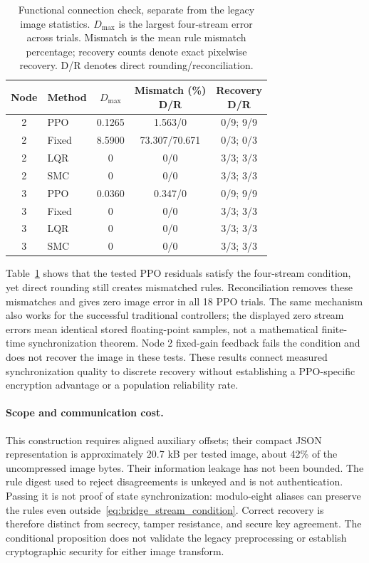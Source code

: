 \begin{table}[pos=htbp,width=\linewidth]
\centering\small
\setlength{\tabcolsep}{3pt}
\caption{Functional connection check, separate from the legacy image statistics. $D_{\max}$ is the largest four-stream error across trials. Mismatch is the mean rule mismatch percentage; recovery counts denote exact pixelwise recovery. D/R denotes direct rounding/reconciliation.}
\label{tab:sync_application_bridge}
\begin{tabular}{@{}clccc@{}}
\toprule
Node & Method & $D_{\max}$ & \makecell{Mismatch (\%)\\D/R} & \makecell{Recovery\\D/R}\\
\midrule
2 & PPO & 0.1265 & 1.563/0 & 0/9; 9/9\\
2 & Fixed & 8.5900 & 73.307/70.671 & 0/3; 0/3\\
2 & LQR & 0 & 0/0 & 3/3; 3/3\\
2 & SMC & 0 & 0/0 & 3/3; 3/3\\
3 & PPO & 0.0360 & 0.347/0 & 0/9; 9/9\\
3 & Fixed & 0 & 0/0 & 3/3; 3/3\\
3 & LQR & 0 & 0/0 & 3/3; 3/3\\
3 & SMC & 0 & 0/0 & 3/3; 3/3\\
\bottomrule
\end{tabular}
\end{table}

Table~\ref{tab:sync_application_bridge} shows that the tested PPO residuals satisfy the four-stream condition, yet direct rounding still creates mismatched rules. Reconciliation removes these mismatches and gives zero image error in all 18 PPO trials. The same mechanism also works for the successful traditional controllers; the displayed zero stream errors mean identical stored floating-point samples, not a mathematical finite-time synchronization theorem. Node 2 fixed-gain feedback fails the condition and does not recover the image in these tests. These results connect measured synchronization quality to discrete recovery without establishing a PPO-specific encryption advantage or a population reliability rate.

\paragraph{Scope and communication cost.}
This construction requires aligned auxiliary offsets; their compact JSON representation is approximately 20.7 kB per tested image, about 42\% of the uncompressed image bytes. Their information leakage has not been bounded. The rule digest used to reject disagreements is unkeyed and is not authentication. Passing it is not proof of state synchronization: modulo-eight aliases can preserve the rules even outside~\eqref{eq:bridge_stream_condition}. Correct recovery is therefore distinct from secrecy, tamper resistance, and secure key agreement. The conditional proposition does not validate the legacy preprocessing or establish cryptographic security for either image transform.
